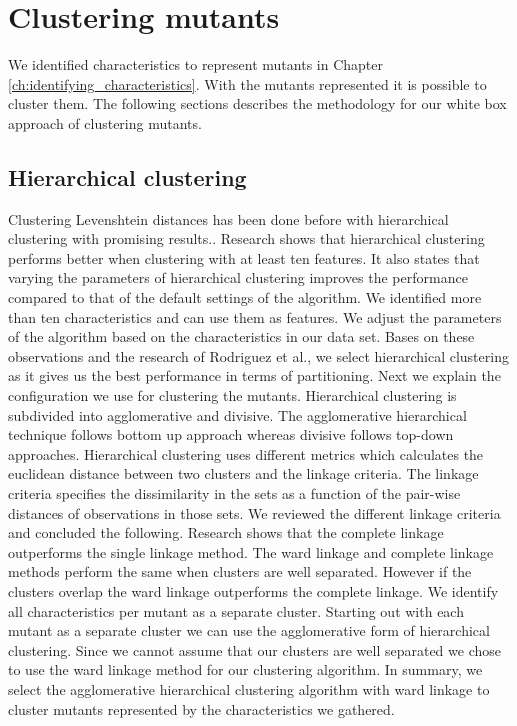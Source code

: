 \documentclass[../../main]{subfiles}
\begin{document}
\section{Clustering mutants}
\label{ch:clustering_characteristics}
We identified characteristics to represent mutants in Chapter \ref{ch:identifying_characteristics}.
With the mutants represented it is possible to cluster them.
The following sections describes the methodology for our white box approach of clustering mutants.

\subsection{Hierarchical clustering}
Clustering Levenshtein distances has been done before with hierarchical clustering with promising results.\cite{Rajalingam2011, Gothai2010PerformanceAlgorithms}. 
Research shows that hierarchical clustering performs better when clustering with at least ten features\cite{Rodriguez2019}.
It also states that varying the parameters of hierarchical clustering improves the performance compared to that of the default settings of the algorithm\cite{Rodriguez2019}.
We identified more than ten characteristics and can use them as features.
We adjust the parameters of the algorithm based on the characteristics in our data set.
Bases on these observations and the research of Rodriguez et al., we select hierarchical clustering as it gives us the best performance in terms of partitioning.
Next we explain the configuration we use for clustering the mutants. 
\newline
Hierarchical clustering is subdivided into agglomerative and divisive. 
The agglomerative hierarchical technique follows bottom up approach whereas divisive follows top-down approaches.
Hierarchical clustering uses different metrics which calculates the euclidean distance between two clusters and the linkage criteria\cite{Rajalingam2011}. 
The linkage criteria specifies the dissimilarity in the sets as a function of the pair-wise distances of observations in those sets\cite{Rajalingam2011}.
We reviewed the different linkage criteria and concluded the following.
\newline
Research shows that the complete linkage outperforms the single linkage method\cite{Vijaya2019ComparativeClustering}.
The ward linkage and complete linkage methods perform the same when clusters are well separated\cite{Vijaya2019ComparativeClustering}.
However if the clusters overlap the ward linkage outperforms the complete linkage\cite{Vijaya2019ComparativeClustering}.
\newline
We identify all characteristics per mutant as a separate cluster.
Starting out with each mutant as a separate cluster we can use the agglomerative form of hierarchical clustering.
Since we cannot assume that our clusters are well separated we chose to use the ward linkage method for our clustering algorithm.
In summary, we select the agglomerative hierarchical clustering algorithm with ward linkage to cluster mutants represented by the characteristics we gathered.
\end{document}
